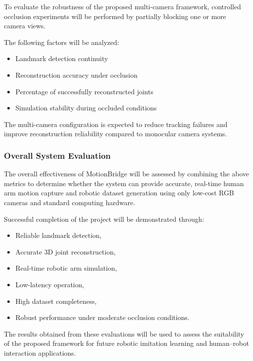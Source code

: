 To evaluate the robustness of the proposed multi-camera framework, controlled occlusion experiments will be performed by partially blocking one or more camera views.

The following factors will be analyzed:

\begin{itemize}
    \item Landmark detection continuity
    \item Reconstruction accuracy under occlusion
    \item Percentage of successfully reconstructed joints
    \item Simulation stability during occluded conditions
\end{itemize}

The multi-camera configuration is expected to reduce tracking failures and improve reconstruction reliability compared to monocular camera systems.

\subsubsection{Overall System Evaluation}

The overall effectiveness of MotionBridge will be assessed by combining the above metrics to determine whether the system can provide accurate, real-time human arm motion capture and robotic dataset generation using only low-cost RGB cameras and standard computing hardware.

Successful completion of the project will be demonstrated through:

\begin{itemize}
    \item Reliable landmark detection,
    \item Accurate 3D joint reconstruction,
    \item Real-time robotic arm simulation,
    \item Low-latency operation,
    \item High dataset completeness,
    \item Robust performance under moderate occlusion conditions.
\end{itemize}

The results obtained from these evaluations will be used to assess the suitability of the proposed framework for future robotic imitation learning and human--robot interaction applications.